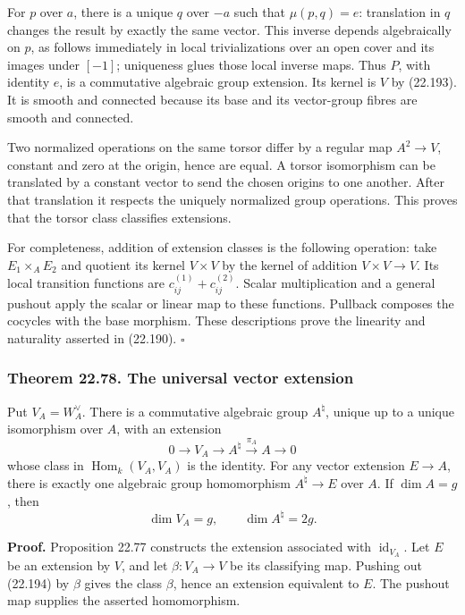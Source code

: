 \documentclass[
  11pt,
  a4paper,
]{article}
\begin{document}
For \(p\) over \(a\), there is a unique \(q\) over \(-a\) such that
\(\mu(p,q)=e\): translation in \(q\) changes the result by exactly the
same vector. This inverse depends algebraically on \(p\), as follows
immediately in local trivializations over an open cover and its images
under \([-1]\); uniqueness glues those local inverse maps. Thus \(P\),
with identity \(e\), is a commutative algebraic group extension. Its
kernel is \(V\) by (22.193). It is smooth and connected because its base
and its vector-group fibres are smooth and connected.

Two normalized operations on the same torsor differ by a regular map
\(A^2\to V\), constant and zero at the origin, hence are equal. A torsor
isomorphism can be translated by a constant vector to send the chosen
origins to one another. After that translation it respects the uniquely
normalized group operations. This proves that the torsor class
classifies extensions.

For completeness, addition of extension classes is the following
operation: take \(E_1\times_AE_2\) and quotient its kernel \(V\times V\)
by the kernel of addition \(V\times V\to V\). Its local transition
functions are \(c^{(1)}_{ij}+c^{(2)}_{ij}\). Scalar multiplication and a
general pushout apply the scalar or linear map to these functions.
Pullback composes the cocycles with the base morphism. These
descriptions prove the linearity and naturality asserted in (22.190).
\(\square\)

\subsubsection{Theorem 22.78. The universal vector
extension}\label{theorem-22.78.-the-universal-vector-extension}

Put \(V_A=W_A^\vee\). There is a commutative algebraic group
\(A^\natural\), unique up to a unique isomorphism over \(A\), with an
extension \[
 0\longrightarrow V_A\longrightarrow A^\natural
       \xrightarrow{\pi_A}A\longrightarrow0
 \tag{22.194}
\] whose class in \(\operatorname{Hom}_k(V_A,V_A)\) is the identity. For
any vector extension \(E\to A\), there is exactly one algebraic group
homomorphism \(A^\natural\to E\) over \(A\). If \(\dim A=g\), then \[
 \dim V_A=g,\qquad \dim A^\natural=2g.
 \tag{22.195}
\]

\textbf{Proof.} Proposition 22.77 constructs the extension associated
with \(\operatorname{id}_{V_A}\). Let \(E\) be an extension by \(V\),
and let \(\beta:V_A\to V\) be its classifying map. Pushing out (22.194)
by \(\beta\) gives the class \(\beta\), hence an extension equivalent to
\(E\). The pushout map supplies the asserted homomorphism.
\end{document}
